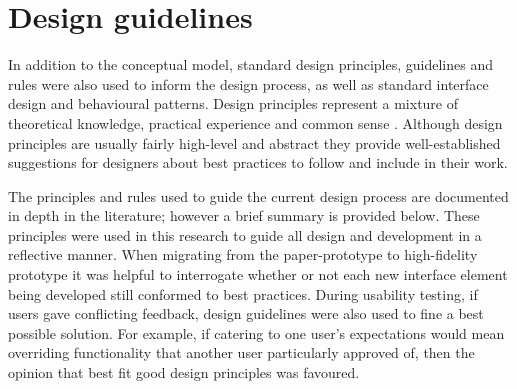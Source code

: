 \section{Design guidelines}
In addition to the conceptual model, standard design principles, guidelines and rules were also used to inform the design process, as well as standard interface design and behavioural patterns. Design principles represent a mixture of theoretical knowledge, practical experience and common sense \citep[p. 26]{RogersPreece}. Although design principles are usually fairly high-level and abstract they provide well-established suggestions for designers about best practices to follow and include in their work. 

The principles and rules used to guide the current design process are documented in depth in the literature; however a brief summary is provided below. These principles were used in this research to guide all design and development in a reflective manner. When migrating from the paper-prototype to high-fidelity prototype it was helpful to interrogate whether or not each new interface element being developed still conformed to best practices. During usability testing, if users gave conflicting feedback, design guidelines were also used to fine a best possible solution. For example, if catering to one user's expectations would mean overriding functionality that another user particularly approved of, then the opinion that best fit good design principles was favoured. 

